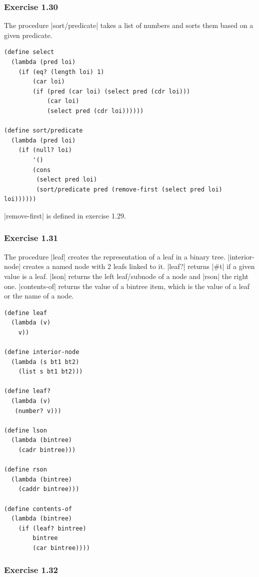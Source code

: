 \documentclass[a4paper]{article}
\begin{document}
\subsubsection{Exercise 1.30}

The procedure |sort/predicate| takes a list of numbers and sorts them based on a given predicate.

\begin{lstlisting}
(define select
  (lambda (pred loi)
    (if (eq? (length loi) 1)
        (car loi)
        (if (pred (car loi) (select pred (cdr loi)))
            (car loi)
            (select pred (cdr loi))))))

(define sort/predicate
  (lambda (pred loi)
    (if (null? loi)
        '()
        (cons
         (select pred loi)
         (sort/predicate pred (remove-first (select pred loi) loi))))))
\end{lstlisting}

|remove-first| is defined in exercise 1.29.

\subsubsection{Exercise 1.31}

The procedure |leaf| creates the representation of a leaf in a binary tree. |interior-node| creates a named node with 2 leafs linked to it. |leaf?| returns |#t| if a given value is a leaf. |lson| returns the left leaf/subnode of a node and |rson| the right one. |contents-of| returns the value of a bintree item, which is the value of a leaf or the name of a node.

\begin{lstlisting}
(define leaf
  (lambda (v)
    v))

(define interior-node
  (lambda (s bt1 bt2)
    (list s bt1 bt2)))

(define leaf?
  (lambda (v)
   (number? v)))

(define lson
  (lambda (bintree)
    (cadr bintree)))

(define rson
  (lambda (bintree)
    (caddr bintree)))

(define contents-of
  (lambda (bintree)
    (if (leaf? bintree)
        bintree
        (car bintree))))
\end{lstlisting}

\subsubsection{Exercise 1.32}
\end{document}

